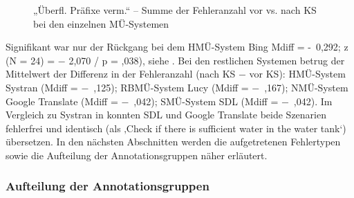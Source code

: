 \begin{figure}





\caption{\label{fig:05:113}„Überfl. Präfixe verm.“ -- Summe der Fehleranzahl vor vs. nach KS bei den einzelnen MÜ-Systemen   }
\end{figure}

Signifikant war nur der Rückgang bei dem HMÜ-System Bing Mdiff = -~0,292; z (N = 24) = $-$ 2,070 / p = ,038), siehe . Bei den restlichen Systemen betrug der Mittelwert der Differenz in der Fehleranzahl (nach KS $-$ vor KS): HMÜ-System Systran (Mdiff = $-$~,125); RBMÜ-System Lucy (Mdiff = $-$~,167); NMÜ-System Google Translate (Mdiff = $-$~,042); SMÜ-System SDL (Mdiff = $-$~,042). Im Vergleich zu Systran in  konnten SDL und Google Translate beide Szenarien fehlerfrei und identisch (als ‚Check if there is sufficient water in the water tank‘) übersetzen. In den nächsten Abschnitten werden die aufgetretenen Fehlertypen sowie die Aufteilung der Annotationsgruppen näher erläutert.

\subsubsection{\label{sec:5.3.8.2}Aufteilung der Annotationsgruppen}

